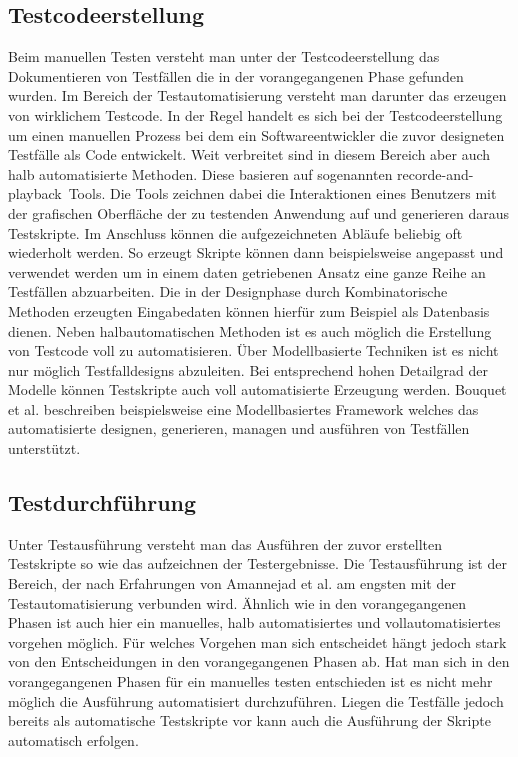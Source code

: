 \subsection{Testcodeerstellung}
\label{subsec:testcodeerstellung}
Beim manuellen Testen versteht man unter der Testcodeerstellung das Dokumentieren von Testfällen die in der vorangegangenen Phase gefunden wurden. 
Im Bereich der Testautomatisierung versteht man darunter das erzeugen von wirklichem Testcode.
In der Regel handelt es sich bei der Testcodeerstellung um einen manuellen Prozess bei dem ein Softwareentwickler die zuvor designeten Testfälle als Code entwickelt.
Weit verbreitet sind in diesem Bereich aber auch halb automatisierte Methoden. Diese basieren auf sogenannten \glqq recorde-and-playback\grqq\ Tools. Die Tools zeichnen dabei die Interaktionen eines Benutzers mit der grafischen Oberfläche der zu testenden Anwendung auf und generieren daraus Testskripte.
Im Anschluss können die aufgezeichneten Abläufe beliebig oft wiederholt werden.
So erzeugt Skripte können dann beispielsweise angepasst und verwendet werden um in einem daten getriebenen Ansatz eine ganze Reihe an Testfällen abzuarbeiten.
Die in der Designphase durch Kombinatorische Methoden erzeugten Eingabedaten können hierfür zum Beispiel als Datenbasis dienen.
Neben halbautomatischen Methoden ist es auch möglich die Erstellung von Testcode voll zu automatisieren.
Über Modellbasierte Techniken ist es nicht nur möglich Testfalldesigns abzuleiten. Bei entsprechend hohen Detailgrad der Modelle können Testskripte auch voll automatisierte Erzeugung werden.
Bouquet et al. \cite{bouquet_test_2008} beschreiben beispielsweise eine Modellbasiertes Framework welches das automatisierte designen, generieren, managen und ausführen von Testfällen unterstützt.

\subsection{Testdurchführung}
\label{subsec:testdurchführung}
Unter Testausführung versteht man das Ausführen der zuvor erstellten Testskripte so wie das aufzeichnen der Testergebnisse.
Die Testausführung ist der Bereich, der nach Erfahrungen von Amannejad et al. \cite{amannejad_search-based_2014} am engsten mit der Testautomatisierung verbunden wird. Ähnlich wie in den vorangegangenen Phasen ist auch hier ein manuelles, halb automatisiertes und vollautomatisiertes vorgehen möglich.
Für welches Vorgehen man sich entscheidet hängt jedoch stark von den Entscheidungen in den vorangegangenen Phasen ab.
Hat man sich in den vorangegangenen Phasen für ein manuelles testen entschieden ist es nicht mehr möglich die Ausführung automatisiert durchzuführen. Liegen die Testfälle jedoch bereits als automatische Testskripte vor kann auch die Ausführung der Skripte automatisch erfolgen.

